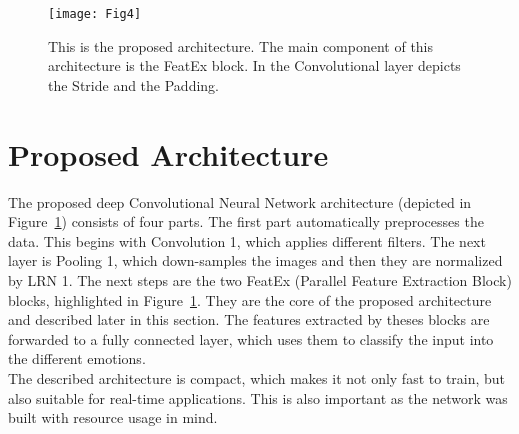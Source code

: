 \documentclass[10pt,journal,compsoc, hidelinks]{IEEEtran}
\begin{document}
 \begin{figure}[]\centering
\texttt{[image: Fig4]}

\caption{This is the proposed architecture. The main component of this architecture is the FeatEx block. In the Convolutional layer  depicts the Stride and  the Padding.}
\label{fig:architecture}
\end{figure}


\section{Proposed Architecture}
\label{sec:architecture}


The proposed deep Convolutional Neural Network architecture (depicted in Figure~\ref{fig:architecture}) consists of four parts. The first part automatically preprocesses the data. This begins with Convolution 1, which applies  different filters. The next layer is Pooling 1, which down-samples the images and then they are normalized by LRN 1. The next steps are the two FeatEx (Parallel Feature Extraction Block) blocks, highlighted in Figure~\ref{fig:architecture}. They are the core of the proposed architecture and described later in this section. The features extracted by theses blocks are forwarded to a fully connected layer, which uses them to classify the input into the different emotions.\\
The described architecture is compact, which makes it not only fast to train, but also suitable for real-time applications. This is also important as the network was built with resource usage in mind.
\end{document}
